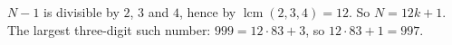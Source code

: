 $N-1$ is divisible by $2$, $3$ and $4$, hence by $\operatorname{lcm}(2,3,4)=12$. So $N=12k+1$. The largest three-digit such number: $999=12\cdot83+3$, so $12\cdot83+1=\boxed{997}$.

